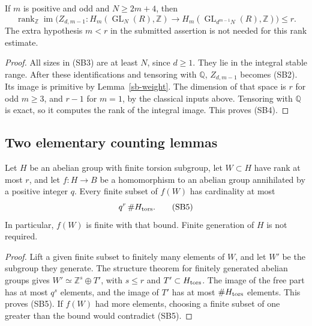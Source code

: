\begin{proposition}\label{sb-odd-rank}
If \(m\) is positive and odd and \(N\ge2m+4\), then
\[
 \operatorname{rank}_{\mathbb Z}
 \operatorname{im}\bigl(Z_{d,m-1}:
 H_m(\operatorname{GL}_N(R),\mathbb Z)
 \longrightarrow H_m(\operatorname{GL}_{d^{m-1}N}(R),\mathbb Z)
                         \bigr)\le r .
 \tag{SB4}
\]
The extra hypothesis \(m<r\) in the submitted assertion
is not needed for this rank estimate.
\end{proposition}
\begin{proof}
All sizes in (SB3) are at least \(N\), since \(d\ge1\).
They lie in the integral stable range.  After these
identifications and tensoring with \(\mathbb Q\),
\(Z_{d,m-1}\) becomes (SB2).
Its image is primitive by Lemma~\ref{sb-weight}.
The dimension of that space is \(r\) for odd
\(m\ge3\), and \(r-1\) for \(m=1\), by the classical
inputs above.  Tensoring with \(\mathbb Q\) is exact,
so it computes the rank of the integral image.
This proves (SB4).
\end{proof}

\subsection{Two elementary counting lemmas}

\begin{lemma}\label{sb-finite-rank}
Let \(H\) be an abelian group with finite torsion subgroup,
let \(W\subset H\) have rank at most \(r\), and let
\(f:H\to B\) be a homomorphism to an abelian group
annihilated by a positive integer \(q\).  Every finite
subset of \(f(W)\) has cardinality at most
\[
                     q^r\,\#H_{\rm tors}.
 \tag{SB5}
\]
In particular, \(f(W)\) is finite with that bound.
Finite generation of \(H\) is not required.
\end{lemma}
\begin{proof}
Lift a given finite subset to finitely many elements of
\(W\), and let \(W'\) be the subgroup they generate.
The structure theorem for finitely generated abelian
groups gives
\(W'\simeq\mathbb Z^s\oplus T'\), with
\(s\le r\) and \(T'\subset H_{\rm tors}\).
The image of the free part has at most \(q^s\) elements,
and the image of \(T'\) has at most \(\#H_{\rm tors}\)
elements.  This proves (SB5).
If \(f(W)\) had more elements, choosing a finite subset
of one greater than the bound would contradict (SB5).
\end{proof}


